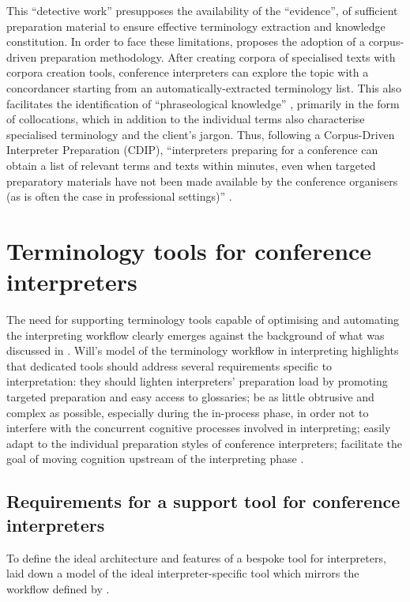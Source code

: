 This ``detective work'' presupposes the availability of the ``evidence'', of sufficient preparation material to ensure effective terminology extraction and knowledge constitution. In order to face these limitations, \citet{fantinuoli_specialized_2006} proposes the adoption of a corpus-driven preparation methodology. After creating corpora of specialised texts with corpora creation tools, conference interpreters can explore the topic with a concordancer starting from an automatically-extracted terminology list. This also facilitates the identification of ``phraseological knowledge'' \citep[29]{fantinuoli_computer-assisted_2017}, primarily in the form of collocations, which in addition to the individual terms also characterise specialised terminology and the client's jargon. Thus, following a Corpus-Driven Interpreter Preparation (CDIP), ``interpreters preparing for a conference can obtain a list of relevant terms and texts within minutes, even when targeted preparatory materials have not been made available by the conference organisers (as is often the case in professional settings)'' \citep[188]{fantinuoli_specialized_2006}.

\section{Terminology tools for conference interpreters} \label{termtoolsint}
The need for supporting terminology tools capable of optimising and automating the interpreting workflow clearly emerges against the background of what was discussed in . Will's model of the terminology workflow in interpreting highlights that dedicated tools should address several requirements specific to interpretation: they should lighten interpreters' preparation load by promoting targeted preparation and easy access to glossaries; be as little obtrusive and complex as possible, especially during the in-process phase, in order not to interfere with the concurrent cognitive processes involved in interpreting; easily adapt to the individual preparation styles of conference interpreters; facilitate the goal of moving cognition upstream of the interpreting phase \citep{stoll_jenseits_2009}.

\subsection{Requirements for a support tool for conference interpreters} \label{requirements_CAI}
To define the ideal architecture and features of a bespoke tool for interpreters, \citet{rutten_terminologieprogramme_2000, rutten_why_2004, rutten_informations-_2007} laid down a model of the ideal interpreter-specific tool which mirrors the workflow defined by \citet{will_bemerkungen_2000,will_terminology_2007}.

